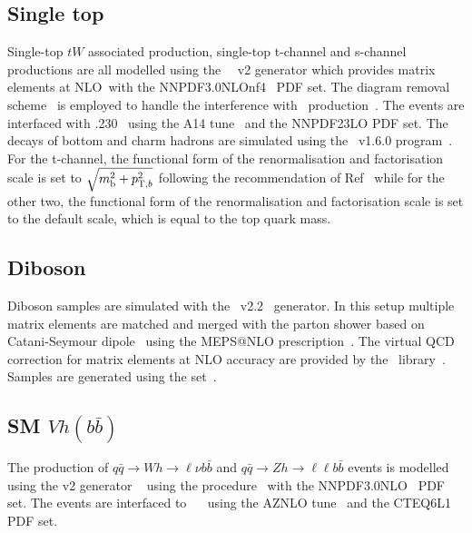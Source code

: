 \subsection{Single top}

\par Single-top $tW$ associated production, single-top t-channel and s-channel productions are all modelled using the \powhegbox~\cite{Frederix:2012dh,Nason:2004rx,Frixione:2007vw,Alioli:2010xd}~v2
generator which provides matrix elements at NLO\
with the NNPDF3.0NLOnf4~\cite{Ball:2014uwa} PDF set.
The diagram removal scheme~\cite{Frixione:2008yi} is employed to handle the interference with \ttbar\ production~\cite{ATL-PHYS-PUB-2016-020}.
The events are interfaced with \pythia.230~\cite{Sjostrand:2014zea} using the A14 tune~\cite{ATL-PHYS-PUB-2014-021} and the NNPDF23LO PDF set.
The decays of bottom and charm hadrons are simulated using the \evtgen\ v1.6.0 program~\cite{EvtGen}.
For the t-channel, the functional form of the renormalisation and factorisation scale is set to $\sqrt{m_{\textrm{b}}^2 + p_{{\textrm T},b}^2}$
following the recommendation of Ref~\cite{Frederix:2012dh} while for the other two, the functional form of the renormalisation and factorisation scale is set to the default scale, which is equal to the top quark mass.

\subsection{Diboson}

\par Diboson samples are simulated with the \sherpa~v2.2~\cite{Bothmann:2019yzt} generator. 
In this setup multiple matrix elements are matched and merged with the \sherpa parton shower based on Catani-Seymour dipole~\cite{Gleisberg:2008fv,Schumann:2007mg} using the MEPS@NLO prescription~\cite{Hoeche:2011fd,Hoeche:2012yf,Catani:2001cc,Hoeche:2009rj}. 
The virtual QCD correction for matrix elements at NLO accuracy are provided by the \openloops\ library~\cite{Cascioli:2011va,Denner:2016kdg}. 
Samples are generated using the \nnpdfnnlo set~\cite{Ball:2014uwa}.

\subsection{SM $Vh(b\bar{b})$}

\par The production of $q\bar{q}\to Wh\to \ell\nu b\bar{b}$ and $q\bar{q}\to Zh\to \ell\ell b\bar{b}$ events is modelled using the \powhegbox v2 generator
~\cite{Alioli:2010xd} using the \minlo procedure~\cite{Hamilton:2012np,Luisoni:2013kna} with the NNPDF3.0NLO~\cite{Ball:2014uwa} PDF set.
The events are interfaced to \pythia~\cite{Sjostrand:2014zea}~ using the AZNLO tune~\cite{Aad:2014xaa} and the CTEQ6L1~\cite{Pumplin:2002vw} PDF set.

